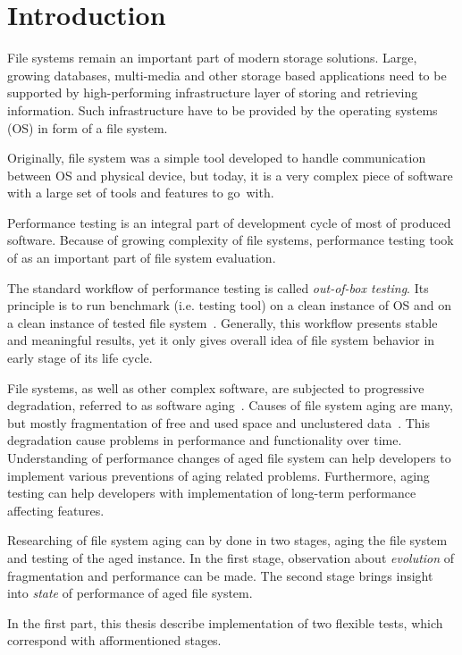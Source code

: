 \documentclass[
  color, %
  table, %
  lof,   %
  lot,   %
]{fithesis3}
\begin{document}
\chapter{Introduction}
File systems remain an important part of modern storage solutions. Large, growing databases, multi-media and other storage based applications need to be supported by high-performing infrastructure layer of storing and retrieving information. Such infrastructure have to be provided by the operating systems (OS) in form of a file system.

Originally, file system was a simple tool developed to handle communication between OS and physical device, but today, it is a very complex piece of software with a large set of tools and features to go~with.

Performance testing is an integral part of development cycle of most of produced software. Because of growing complexity of file systems, performance testing took of as an important part of file system evaluation.

The standard workflow of performance testing is called \emph{out-of-box testing}. Its principle is to run benchmark (i.e. testing tool) on a clean instance of OS and on a clean instance of tested file system~\cite{Traeger:2008:NYS:1367829.1367831}. Generally, this workflow presents stable and meaningful results, yet it only gives overall idea of file system behavior in early stage of its life cycle. 

File systems, as well as other complex software, are subjected to progressive degradation, referred to as software aging~\cite{Cotroneo:2014:SSA:2543749.2539117}. Causes of file system aging are many, but mostly fragmentation of free and used space and unclustered data~\cite{Smith:1997:FSA:258623.258689}. This degradation cause problems in performance and functionality over time. Understanding of performance changes of aged file system can help developers to implement various preventions of aging related problems. Furthermore, aging testing can help developers with implementation of long-term performance affecting features.

Researching of file system aging can by done in two stages, aging the file system and testing of the aged instance. In the first stage, observation about \emph{evolution} of fragmentation and performance can be made. The second stage brings insight into \emph{state} of performance of aged file system.

In the first part, this thesis describe implementation of two flexible tests, which correspond with afformentioned stages.
 
\end{document}
